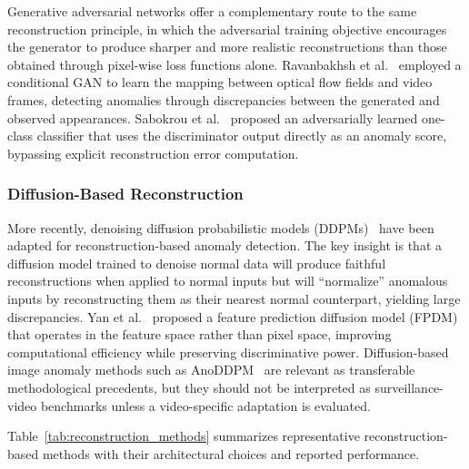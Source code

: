 \documentclass[10pt,a4paper]{article}
\begin{document}
Generative adversarial networks offer a complementary route to the same reconstruction principle, in which the adversarial training objective encourages the generator to produce sharper and more realistic reconstructions than those obtained through pixel-wise loss functions alone. Ravanbakhsh et al.~\citeyearpar{ravanbakhsh2017abnormal} employed a conditional GAN to learn the mapping between optical flow fields and video frames, detecting anomalies through discrepancies between the generated and observed appearances. Sabokrou et al.~\citeyearpar{sabokrou2018adversarially} proposed an adversarially learned one-class classifier that uses the discriminator output directly as an anomaly score, bypassing explicit reconstruction error computation.

\subsubsection{Diffusion-Based Reconstruction}

More recently, denoising diffusion probabilistic models (DDPMs)~\citep{ho2020denoising} have been adapted for reconstruction-based anomaly detection. The key insight is that a diffusion model trained to denoise normal data will produce faithful reconstructions when applied to normal inputs but will ``normalize'' anomalous inputs by reconstructing them as their nearest normal counterpart, yielding large discrepancies. Yan et al.~\citeyearpar{yan2023feature} proposed a feature prediction diffusion model (FPDM) that operates in the feature space rather than pixel space, improving computational efficiency while preserving discriminative power. Diffusion-based image anomaly methods such as AnoDDPM~\citep{wyatt2022anoddpm} are relevant as transferable methodological precedents, but they should not be interpreted as surveillance-video benchmarks unless a video-specific adaptation is evaluated.

Table~\ref{tab:reconstruction_methods} summarizes representative reconstruction-based methods with their architectural choices and reported performance.
\end{document}
